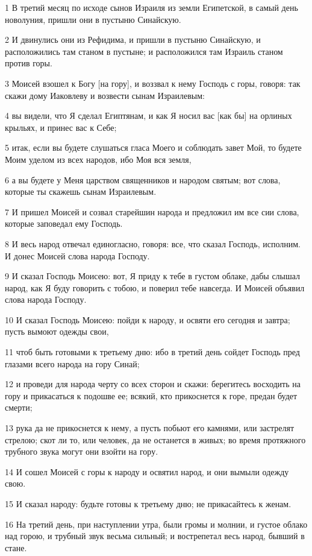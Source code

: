 \par 1 В третий месяц по исходе сынов Израиля из земли Египетской, в самый день новолуния, пришли они в пустыню Синайскую.
\par 2 И двинулись они из Рефидима, и пришли в пустыню Синайскую, и расположились там станом в пустыне; и расположился там Израиль станом против горы.
\par 3 Моисей взошел к Богу [на гору], и воззвал к нему Господь с горы, говоря: так скажи дому Иаковлеву и возвести сынам Израилевым:
\par 4 вы видели, что Я сделал Египтянам, и как Я носил вас [как бы] на орлиных крыльях, и принес вас к Себе;
\par 5 итак, если вы будете слушаться гласа Моего и соблюдать завет Мой, то будете Моим уделом из всех народов, ибо Моя вся земля,
\par 6 а вы будете у Меня царством священников и народом святым; вот слова, которые ты скажешь сынам Израилевым.
\par 7 И пришел Моисей и созвал старейшин народа и предложил им все сии слова, которые заповедал ему Господь.
\par 8 И весь народ отвечал единогласно, говоря: все, что сказал Господь, исполним. И донес Моисей слова народа Господу.
\par 9 И сказал Господь Моисею: вот, Я приду к тебе в густом облаке, дабы слышал народ, как Я буду говорить с тобою, и поверил тебе навсегда. И Моисей объявил слова народа Господу.
\par 10 И сказал Господь Моисею: пойди к народу, и освяти его сегодня и завтра; пусть вымоют одежды свои,
\par 11 чтоб быть готовыми к третьему дню: ибо в третий день сойдет Господь пред глазами всего народа на гору Синай;
\par 12 и проведи для народа черту со всех сторон и скажи: берегитесь восходить на гору и прикасаться к подошве ее; всякий, кто прикоснется к горе, предан будет смерти;
\par 13 рука да не прикоснется к нему, а пусть побьют его камнями, или застрелят стрелою; скот ли то, или человек, да не останется в живых; во время протяжного трубного звука могут они взойти на гору.
\par 14 И сошел Моисей с горы к народу и освятил народ, и они вымыли одежду свою.
\par 15 И сказал народу: будьте готовы к третьему дню; не прикасайтесь к женам.
\par 16 На третий день, при наступлении утра, были громы и молнии, и густое облако над горою, и трубный звук весьма сильный; и вострепетал весь народ, бывший в стане.
